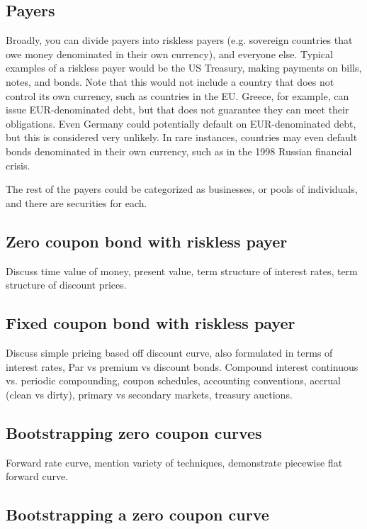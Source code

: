 \documentclass{report}
\numberwithin{problem}{chapter} %
\begin{document}
\subsection{Payers}
Broadly, you can divide payers into riskless payers (e.g. sovereign countries that owe money denominated in their own currency), and everyone else. Typical examples of a riskless payer would be the US Treasury, making payments on bills, notes, and bonds.  Note that this would not include a country that does not control its own currency, such as countries in the EU. Greece, for example, can issue EUR-denominated debt, but that does not guarantee they can meet their obligations. Even Germany could potentially default on EUR-denominated debt, but this is considered very unlikely. In rare instances, countries may even default bonds denominated in their own currency, such as in the 1998 Russian financial crisis. 

The rest of the payers could be categorized as businesses, or pools of individuals, and there are securities for each. 

\subsection{Zero coupon bond with riskless payer}
Discuss time value of money, present value, term structure of interest rates, term structure of discount prices.

\subsection{Fixed coupon bond with riskless payer}
Discuss simple pricing based off discount curve, also formulated in terms of interest rates, Par vs premium vs discount bonds. Compound interest continuous vs. periodic compounding, coupon schedules, accounting conventions, accrual (clean vs dirty), primary vs secondary markets, treasury auctions. 

\subsection{Bootstrapping zero coupon curves}
Forward rate curve, mention variety of techniques, demonstrate piecewise flat forward curve.




\subsection{Bootstrapping a zero coupon curve}

\printbibliography
\end{document}
